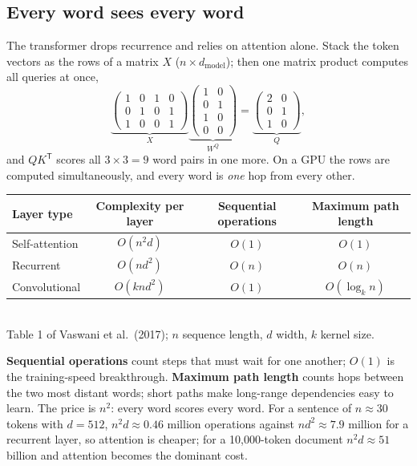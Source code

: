 \documentclass[11pt]{article}
\begin{document}
\subsection{Every word sees every word}
The transformer drops recurrence and relies on attention alone. Stack the token vectors as the rows of a matrix $X$ ($n\times d_{\text{model}}$); then one matrix product computes all queries at once,
\[\underbrace{\begin{pmatrix}1&0&1&0\\0&1&0&1\\1&0&0&1\end{pmatrix}}_{X}\underbrace{\begin{pmatrix}1&0\\0&1\\1&0\\0&0\end{pmatrix}}_{W^Q}=\underbrace{\begin{pmatrix}2&0\\0&1\\1&0\end{pmatrix}}_{Q},\]
and $QK^{\mathsf T}$ scores all $3\times3=9$ word pairs in one more. On a GPU the rows are computed simultaneously, and every word is \emph{one} hop from every other.
\begin{center}\small\renewcommand{\arraystretch}{1.3}
\begin{tabular}{lccc}\toprule
\textbf{Layer type} & \textbf{Complexity per layer} & \textbf{Sequential operations} & \textbf{Maximum path length}\\\midrule
Self-attention & $O(n^2 d)$ & $O(1)$ & $O(1)$\\
Recurrent & $O(n d^2)$ & $O(n)$ & $O(n)$\\
Convolutional & $O(k n d^2)$ & $O(1)$ & $O(\log_k n)$\\\bottomrule
\end{tabular}\\[2pt]{\small\color{GreyN}Table 1 of Vaswani et al.\ (2017); $n$ sequence length, $d$ width, $k$ kernel size.}\end{center}
\textbf{Sequential operations} count steps that must wait for one another; $O(1)$ is the training-speed breakthrough. \textbf{Maximum path length} counts hops between the two most distant words; short paths make long-range dependencies easy to learn. The price is $n^2$: every word scores every word. For a sentence of $n\approx30$ tokens with $d=512$, $n^2d\approx0.46$ million operations against $nd^2\approx7.9$ million for a recurrent layer, so attention is cheaper; for a 10,000-token document $n^2d\approx51$ billion and attention becomes the dominant cost.
\end{document}
